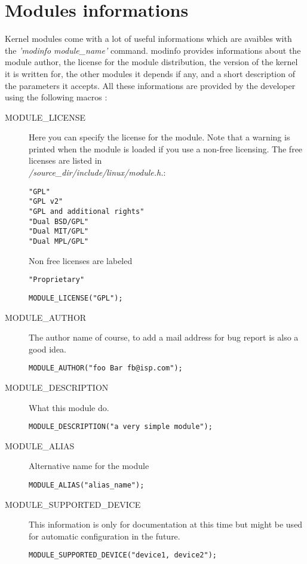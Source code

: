 \documentclass{article}
\begin{document}
\section{Modules informations}
Kernel modules come with a lot of useful informations which are
avaibles with the {\it'modinfo module\_name'} command.
modinfo provides informations about the module author, the license for
the module distribution, the version of the kernel it is written for,
the other modules it depends if any, and a short description of the
parameters it accepts.
All these informations are provided by the developer using the following macros :
\begin{description}
\item[MODULE\_LICENSE]
Here you can specify the license for the module. Note that a warning is printed
when the module is loaded if you use a non-free licensing.
The free licenses are listed in\\
{\it/source\_dir/include/linux/module.h.}:
\begin{lstlisting}
"GPL"
"GPL v2"
"GPL and additional rights"
"Dual BSD/GPL"
"Dual MIT/GPL"
"Dual MPL/GPL"
\end{lstlisting}
Non free licenses are labeled
\begin{lstlisting}
"Proprietary"
\end{lstlisting}

\begin{lstlisting}
MODULE_LICENSE("GPL");
\end{lstlisting}

\item[MODULE\_AUTHOR]
The author name of course, to add a mail address for bug report is also
a good idea.
\begin{lstlisting}
MODULE_AUTHOR("foo Bar fb@isp.com");
\end{lstlisting}

\item[MODULE\_DESCRIPTION]
What this module do.
\begin{lstlisting}
MODULE_DESCRIPTION("a very simple module");
\end{lstlisting}

\item[MODULE\_ALIAS]
Alternative name for the module
\begin{lstlisting}
MODULE_ALIAS("alias_name");
\end{lstlisting}

\item[MODULE\_SUPPORTED\_DEVICE]
This information is only for documentation at this time
but might be used for automatic configuration in the future.
\begin{lstlisting}
MODULE_SUPPORTED_DEVICE("device1, device2");
\end{lstlisting}


\end{description}
\end{document}
